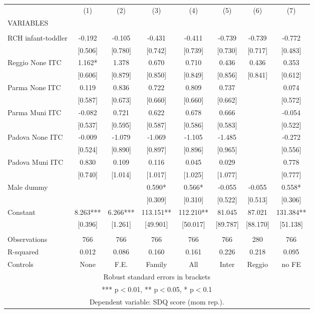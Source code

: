 \begin{tabular}{lccccccc} \hline
 & (1) & (2) & (3) & (4) & (5) & (6) & (7) \\
VARIABLES &  &  &  &  &  &  &  \\ \hline
 &  &  &  &  &  &  &  \\
RCH infant-toddler & -0.192 & -0.105 & -0.431 & -0.411 & -0.739 & -0.739 & -0.772 \\
 & [0.506] & [0.780] & [0.742] & [0.739] & [0.730] & [0.717] & [0.483] \\
Reggio None ITC & 1.162* & 1.378 & 0.670 & 0.710 & 0.436 & 0.436 & 0.353 \\
 & [0.606] & [0.879] & [0.850] & [0.849] & [0.856] & [0.841] & [0.612] \\
Parma None ITC & 0.119 & 0.836 & 0.722 & 0.809 & 0.737 &  & 0.074 \\
 & [0.587] & [0.673] & [0.660] & [0.660] & [0.662] &  & [0.572] \\
Parma Muni ITC & -0.082 & 0.721 & 0.622 & 0.678 & 0.666 &  & -0.054 \\
 & [0.537] & [0.595] & [0.587] & [0.586] & [0.583] &  & [0.522] \\
Padova None ITC & -0.009 & -1.079 & -1.069 & -1.105 & -1.485 &  & -0.272 \\
 & [0.524] & [0.890] & [0.897] & [0.896] & [0.965] &  & [0.556] \\
Padova Muni ITC & 0.830 & 0.109 & 0.116 & 0.045 & 0.029 &  & 0.778 \\
 & [0.740] & [1.014] & [1.017] & [1.025] & [1.077] &  & [0.777] \\
Male dummy &  &  & 0.590* & 0.566* & -0.055 & -0.055 & 0.558* \\
 &  &  & [0.309] & [0.310] & [0.522] & [0.513] & [0.306] \\
Constant & 8.263*** & 6.266*** & 113.151** & 112.210** & 81.045 & 87.021 & 131.384** \\
 & [0.396] & [1.261] & [49.901] & [50.017] & [89.787] & [88.170] & [51.138] \\
 &  &  &  &  &  &  &  \\
Observations & 766 & 766 & 766 & 766 & 766 & 280 & 766 \\
R-squared & 0.012 & 0.086 & 0.160 & 0.161 & 0.226 & 0.218 & 0.095 \\
 Controls & None & F.E. & Family & All & Inter & Reggio & no FE \\ \hline
\multicolumn{8}{c}{ Robust standard errors in brackets} \\
\multicolumn{8}{c}{ *** p$<$0.01, ** p$<$0.05, * p$<$0.1} \\
\multicolumn{8}{c}{ Dependent variable: SDQ score (mom rep.).} \\
\end{tabular}
